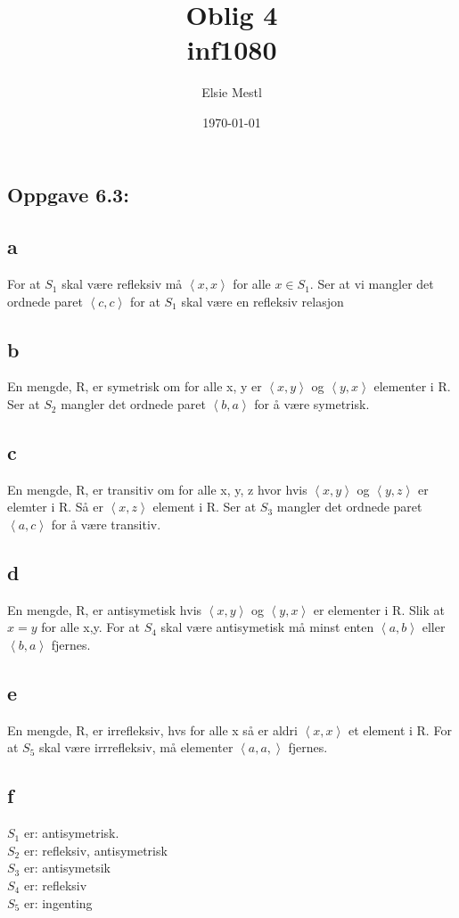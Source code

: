 \documentclass[a4paper, norsk, 10pt]{article}
\date{\today}
\title{Oblig 4 \\ inf1080}
\author{Elsie Mestl}
\begin{document}
\maketitle
\begin{flushleft}
\section*{Oppgave 6.3:}
\subsection*{a}

For at $S_{1}$ skal være refleksiv må $\left<x,x\right>$ for alle $x \in S_{1}$. Ser at vi mangler det ordnede paret $\left<c, c\right>$ for at $S_{1}$ skal være en refleksiv relasjon

\subsection*{b}
En mengde, R, er symetrisk om for alle x, y er $\left<x,y\right>$ og $\left<y, x\right>$ elementer i R. Ser at $S_{2}$ mangler det ordnede paret $\left<b,a\right>$ for å være symetrisk.

\subsection*{c}
En mengde, R, er transitiv om for alle x, y, z  hvor hvis  $\left<x,y\right>$ og $\left<y, z\right>$ er elemter i R. Så er $\left<x, z\right>$ element i R. Ser at $S_{3}$ mangler det ordnede paret $\left<a,c\right>$ for å være transitiv.

\subsection*{d}
En mengde, R, er antisymetisk hvis $\left<x,y\right>$ og $\left<y, x\right>$ er elementer i R. Slik at $x = y$ for alle x,y. For at $S_{4}$ skal være antisymetisk må minst enten $\left<a, b\right>$ eller $\left<b,a\right>$ fjernes.

\subsection*{e}
En mengde, R, er irrefleksiv, hvs for alle x så er aldri $\left< x,x\right>$ et element i R. For at $S_{5}$ skal være irrrefleksiv, må elementer $\left< a,a,\right>$ fjernes.

\subsection*{f}
$S_{1}$ er: \quad antisymetrisk. \\
$S_{2}$ er: \quad refleksiv, antisymetrisk \\
$S_{3}$ er: \quad antisymetsik \\
$S_{4}$ er: \quad refleksiv \\
$S_{5}$ er: \quad ingenting



\end{flushleft}
\end{document}
